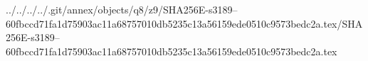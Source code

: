 ../../../../.git/annex/objects/q8/z9/SHA256E-s3189--60fbccd71fa1d75903ac11a68757010db5235c13a56159ede0510c9573bedc2a.tex/SHA256E-s3189--60fbccd71fa1d75903ac11a68757010db5235c13a56159ede0510c9573bedc2a.tex